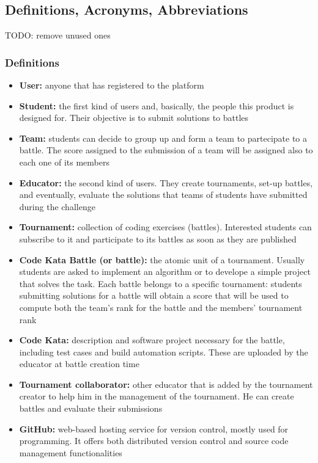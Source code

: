 \subsection{Definitions, Acronyms, Abbreviations}
TODO: remove unused ones
\subsubsection{Definitions}
\begin{itemize}
    \item {\textbf{User:} anyone that has registered to the platform}
    \item {\textbf{Student:} the first kind of users and, basically, the people this product is designed for. Their objective is to submit solutions to battles}
    \item {\textbf{Team:} students can decide to group up and form a team to partecipate to a battle. The score assigned to the submission of a team will be assigned also to each one of its members}
    \item {\textbf{Educator:} the second kind of users. They create tournaments, set-up battles, and eventually, evaluate the solutions that teams of students have submitted during the challenge}
    \item {\textbf{Tournament:} collection of coding exercises (battles). Interested students can subscribe to it and participate to its battles as soon as they are published}
    \item {\textbf{Code Kata Battle (or battle):} the atomic unit of a tournament. Usually students are asked to implement an algorithm or to develope a simple project that solves the task. Each battle belongs to a specific tournament: students submitting solutions for a battle will obtain a score that will be used to compute both the team's rank for the battle and the members' tournament rank}
    \item {\textbf{Code Kata:} description and software project necessary for the battle, including test cases and build automation scripts. These are uploaded by the educator at battle creation time}
    \item {\textbf{Tournament collaborator:} other educator that is added by the tournament creator to help him in the management of the tournament. He can create battles and evaluate their submissions}
    \item {\textbf{GitHub:} web-based hosting service for version control, mostly used for programming. It offers both distributed version control and source code management functionalities}

\end{itemize}
